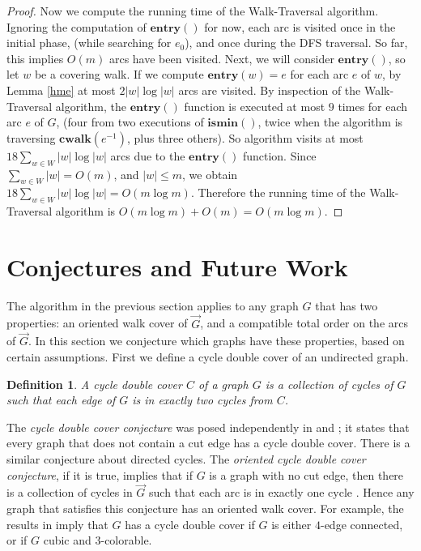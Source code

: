 \documentclass[12pt,letterpaper,oneside]{book}
\newcommand{\cwalk}{\textbf{cwalk}}
\newcommand{\entry}{\textbf{entry}}
\newcommand{\ismin}{\textbf{ismin}}
\newtheorem{definition}[theorem]{Definition}
\begin{document}
\begin{proof}
 
Now we compute the running time of the Walk-Traversal algorithm.  Ignoring the 
computation of $\entry()$ for now, each arc is visited once in the initial phase, (while searching for $e_0$), and once 
during the DFS traversal.  So far, this implies $O(m)$ arcs have been visited.  Next, we will consider $\entry()$, so let $w$ be a covering walk.  
If we compute $\entry(w)=e$ for each arc $e$ of $w$, by Lemma \ref{hme} at most $2 |w| \log |w|$ arcs are visited.  
By inspection of the Walk-Traversal algorithm, 
the $\entry()$ function is executed at most $9$ times for each arc $e$ of $G$, (four from two executions of $\ismin()$, 
twice when the algorithm is traversing $\cwalk(e^{-1})$, plus three others).  So algorithm visits 
at most $18\sum_{w\in W}|w| \log |w|$ arcs due to the $\entry()$ function.  
Since $\sum_{w\in W}|w| =O(m)$, and $|w|\le m$, we obtain $18\sum_{w\in W}|w| \log |w|=O(m\log m)$.  Therefore the running 
time of the Walk-Traversal algorithm is $O(m\log m)+O(m) = O(m\log m)$.  


 

\end{proof}



\newpage
\section{Conjectures and Future Work}%
\label{sconj}
The algorithm in the previous section applies to any graph $G$ that has two properties: an oriented 
walk cover of $\vec{G}$, and a compatible total order on the arcs of $\vec{G}$.  In this section we conjecture which graphs have 
these properties, based on certain assumptions.  First we define a cycle double cover of an undirected graph.

\begin{definition}
A cycle double cover $C$ of a graph $G$ is a collection of cycles of $G$ such that each edge of $G$ is in exactly 
two cycles from $C$.  
\end{definition}

The 
\emph{cycle double cover conjecture} was posed independently in \cite{SY} and \cite{SZ}; it states that every graph 
that does not contain a cut edge has a cycle double cover.  There is a similar conjecture about directed cycles.  The 
\emph{oriented cycle double cover conjecture}, if it is true, implies  that if $G$ is a graph with no cut edge, then there is a collection 
of cycles in $\vec{G}$ such that each arc is in exactly one cycle \cite{J}.  Hence any graph that satisfies this 
conjecture has an oriented walk cover.  For example, the results in \cite{JF} imply that $G$ has a cycle double 
cover if $G$ is either $4$-edge connected, or if $G$ cubic and $3$-colorable.   
\end{document}
